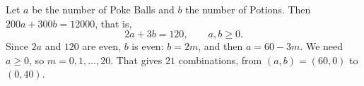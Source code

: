 Let $a$ be the number of Poke Balls and $b$ the number of Potions. Then $200a+300b=12000$, that is,
\[2a+3b=120,\qquad a,b\ge0 .\]
Since $2a$ and $120$ are even, $b$ is even: $b=2m$, and then $a=60-3m$. We need $a\ge0$, so $m=0,1,\ldots,20$. That gives $\boxed{21}$ combinations, from $(a,b)=(60,0)$ to $(0,40)$.
